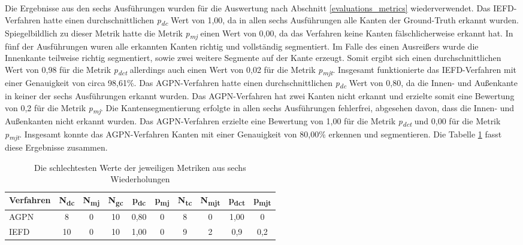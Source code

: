 Die Ergebnisse aus den sechs Ausführungen wurden für die Auswertung nach Abschnitt \ref{evaluations_metrics} wiederverwendet. Das IEFD-Verfahren hatte einen durchschnittlichen \textit{p\textsubscript{dc}} Wert von 1,00, da in allen sechs Ausführungen alle Kanten der Ground-Truth erkannt wurden. Spiegelbildlich zu dieser Metrik hatte die Metrik \textit{p\textsubscript{mj}} einen Wert von 0,00, da das Verfahren keine Kanten fälschlicherweise erkannt hat. In fünf der Ausführungen wuren alle erkannten Kanten richtig und vollständig segmentiert. Im Falle des einen Ausreißers wurde die Innenkante teilweise richtig segmentiert, sowie zwei weitere Segmente auf der Kante erzeugt. Somit ergibt sich einen durchschnittlichen Wert von 0,98 für die Metrik \textit{p\textsubscript{dct}} allerdings auch einen Wert von 0,02 für die Metrik \textit{p\textsubscript{mjt}}. Insgesamt funktionierte das IEFD-Verfahren mit einer Genauigkeit von circa 98,61\%. Das AGPN-Verfahren hatte einen durchschnittlichen \textit{p\textsubscript{dc}} Wert von 0,80, da die Innen- und Außenkante in keiner der sechs Ausführungen erkannt wurden. Das AGPN-Verfahren hat zwei Kanten nicht erkannt und erzielte somit eine Bewertung von 0,2 für die Metrik \textit{p\textsubscript{mj}}. Die Kantensegmentierung erfolgte in allen sechs Ausführungen fehlerfrei, abgesehen davon, dass die Innen- und Außenkanten nicht erkannt wurden. Das AGPN-Verfahren erzielte eine Bewertung von 1,00 für die Metrik \textit{p\textsubscript{dct}} und 0,00 für die Metrik \textit{p\textsubscript{mjt}}. Insgesamt konnte das AGPN-Verfahren Kanten mit einer Genauigkeit von 80,00\% erkennen und segmentieren. Die Tabelle \ref{table: metric_values} fasst diese Ergebnisse zusammen.

\begin{table}[h]
	\centering
	\begin{tabular}{l *{9}{c}}
		\hline
		\textbf{Verfahren} & \textbf{N\textsubscript{dc}} & \textbf{N\textsubscript{mj}} & \textbf{N\textsubscript{gc}} & \textbf{p\textsubscript{dc}} & \textbf{p\textsubscript{mj}} & \textbf{N\textsubscript{tc}} & \textbf{N\textsubscript{mjt}} & \textbf{p\textsubscript{dct}} & \textbf{p\textsubscript{mjt}} \\
		\hline
		AGPN & 8 & 0 & 10 & 0,80 & 0 & 8 & 0 & 1,00 & 0 \\
		IEFD & 10 & 0 & 10 & 1,00 & 0 & 9 & 2 & 0,9 & 0,2 \\
		\hline
	\end{tabular}
	\caption{Die schlechtesten Werte der jeweiligen Metriken aus sechs Wiederholungen}
	\label{table: metric_values}
\end{table}

